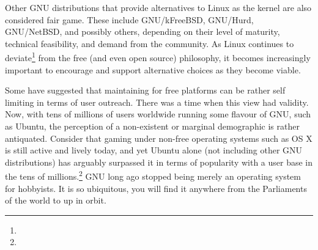 Other GNU distributions that provide alternatives to Linux as the kernel are also considered fair game. These include GNU/kFreeBSD, GNU/Hurd, GNU/NetBSD, and possibly others, depending on their level of maturity, technical feasibility, and demand from the community. As Linux continues to deviate\footnote{} from the free (and even open source) philosophy, it becomes increasingly important to encourage and support alternative choices as they become viable.

Some have suggested that maintaining for free platforms can be rather self limiting in terms of user outreach. There was a time when this view had validity. Now, with tens of millions of users worldwide running some flavour of GNU, such as Ubuntu, the perception of a non-existent or marginal demographic  is rather antiquated. Consider that gaming under non-free operating systems such as OS X is still active and lively today, and yet Ubuntu alone (not including other GNU distributions) has arguably surpassed it in terms of popularity with a user base in the tens of millions.\footnote{} GNU long ago stopped being merely an operating system for hobbyists. It is so ubiquitous, you will find it anywhere from the Parliaments of the world to up in orbit.

\StopChapter


